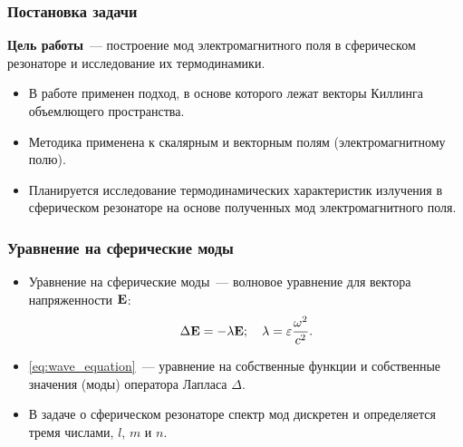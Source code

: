 \documentclass{beamer}
\begin{document}

    \begin{frame}\frametitle{Постановка задачи}

        \textbf{Цель работы}~--- построение мод электромагнитного поля в сферическом резонаторе и исследование их термодинамики.

        \begin{itemize}

            \item В работе применен подход, в основе которого лежат векторы Киллинга объемлющего пространства.

            \item Методика применена к скалярным и векторным полям (электромагнитному полю).

            \item Планируется исследование термодинамических характеристик излучения в сферическом резонаторе на основе полученных мод электромагнитного поля.

        \end{itemize}

    \end{frame}


    \begin{frame}\frametitle{Уравнение на сферические моды}

        \begin{itemize}

            \item Уравнение на сферические моды~--- волновое уравнение для вектора напряженности $\mathbf{E}$:
            \begin{equation}\label{eq:wave_equation}
                \Delta \mathbf{E} = - \lambda \mathbf{E} ; \quad
                    \lambda = \varepsilon \frac{\omega^2}{c^2} .
            \end{equation}

            \item \autoref{eq:wave_equation}~--- уравнение на собственные функции и собственные значения (моды) оператора Лапласа $\Delta$.

            \item В задаче о сферическом резонаторе спектр мод дискретен и определяется тремя числами, $l$, $m$ и $n$.

        \end{itemize}

    \end{frame}
\end{document}
